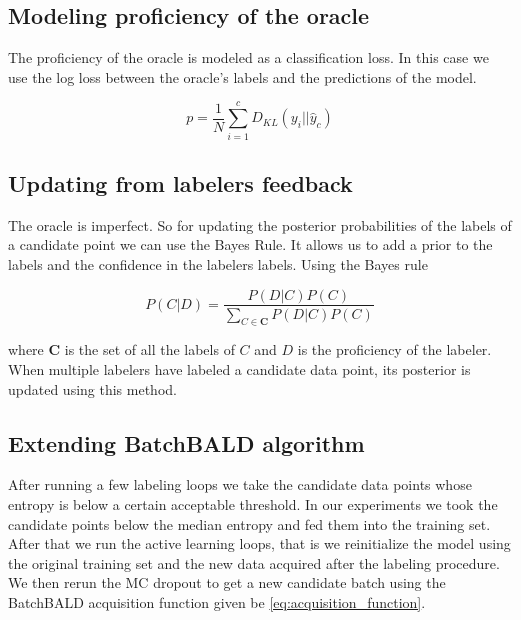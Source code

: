 \documentclass[twoside,11pt]{article}
\begin{document}
\subsection{Modeling proficiency of the oracle}

The proficiency of the oracle is modeled as a classification loss. In this case we use the log loss between the oracle's labels and the predictions of the model.

\begin{equation}
    p = \frac{1}{N} \sum^c_{i=1} D_{KL} (y_i || \hat{y}_c)
\end{equation}

\subsection{Updating from labelers feedback}

The oracle is imperfect. So for updating the posterior probabilities of the labels of a candidate point we can use the Bayes Rule. It allows us to add a prior to the labels and the confidence in the labelers labels. Using the Bayes rule

\begin{equation*}
    P(C|D) = \frac{P(D|C)P(C)}{ \sum_{C \in \boldsymbol{C}} P(D|C)P(C)}
\end{equation*}

where $\boldsymbol{C}$ is the set of all the labels of $C$ and $D$ is the proficiency of the labeler. When multiple labelers have labeled a candidate data point, its posterior is updated using this method.

\subsection{Extending BatchBALD algorithm}

After running a few labeling loops we take the candidate data points whose entropy is below a certain acceptable threshold. In our experiments we took the candidate points below the median entropy and fed them into the training set. After that we run the active learning loops, that is we reinitialize the model using the original training set and the new data acquired after the labeling procedure. We then rerun the MC dropout to get a new candidate batch using the BatchBALD acquisition function given be \eqref{eq:acquisition_function}.
\end{document}

